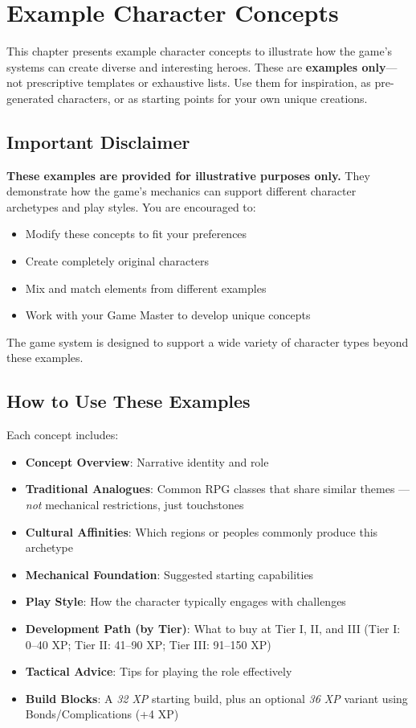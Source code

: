 \chapter{Example Character Concepts}
\label{ch:example-concepts}

This chapter presents example character concepts to illustrate how the game's systems can create diverse and interesting heroes. These are \textbf{examples only}---not prescriptive templates or exhaustive lists. Use them for inspiration, as pre-generated characters, or as starting points for your own unique creations.

\section{Important Disclaimer}
\label{sec:concepts-disclaimer}

\textbf{These examples are provided for illustrative purposes only.} They demonstrate how the game's mechanics can support different character archetypes and play styles. You are encouraged to:
\begin{itemize}
\item Modify these concepts to fit your preferences
\item Create completely original characters
\item Mix and match elements from different examples
\item Work with your Game Master to develop unique concepts
\end{itemize}

The game system is designed to support a wide variety of character types beyond these examples.

\section{How to Use These Examples}
\label{sec:concepts-usage}

Each concept includes:
\begin{itemize}
\item \textbf{Concept Overview}: Narrative identity and role
\item \textbf{Traditional Analogues}: Common RPG classes that share similar themes --- \textit{not} mechanical restrictions, just touchstones
\item \textbf{Cultural Affinities}: Which regions or peoples commonly produce this archetype
\item \textbf{Mechanical Foundation}: Suggested starting capabilities
\item \textbf{Play Style}: How the character typically engages with challenges
\item \textbf{Development Path (by Tier)}: What to buy at Tier I, II, and III (Tier I: 0--40 XP; Tier II: 41--90 XP; Tier III: 91--150 XP)
\item \textbf{Tactical Advice}: Tips for playing the role effectively
\item \textbf{Build Blocks}: A \emph{32 XP} starting build, plus an optional \emph{36 XP} variant using Bonds/Complications (+4 XP)
\end{itemize}

